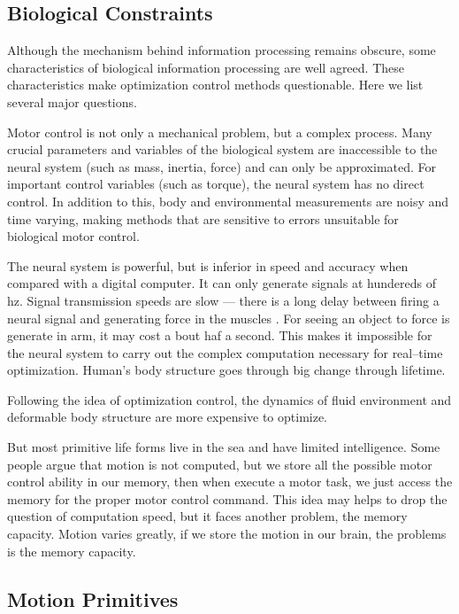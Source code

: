 \subsection{Biological Constraints}
Although the mechanism behind information processing remains obscure, some characteristics of biological information processing are well agreed.
These characteristics make optimization control methods questionable. 
Here we list several major questions\citep{Glynn2003}.  
\begin{itemize}
Motor control is not only a mechanical problem, but a complex process. 
Many crucial parameters and variables of the biological system are inaccessible to the neural system (such as mass, inertia, force) and can only be approximated. 
For important control variables (such as torque), the neural system has no direct control.
In addition to this, body and environmental measurements are noisy and time varying, making methods that are sensitive to errors unsuitable for biological motor control.

The neural system is powerful, but is inferior in speed and accuracy when compared with a digital computer. It can only generate signals at hundereds of hz.
Signal transmission speeds are slow — there is a long delay between firing a neural signal and generating force in the muscles .
For seeing an object to force is generate in arm, it may cost a bout haf a second. 
This makes it impossible for the neural system to carry out the complex computation necessary for real–time optimization.
Human’s body structure goes through big change through lifetime.

Following the idea of optimization control, the dynamics of fluid environment and deformable body structure are more expensive to optimize. 

But most primitive life forms live in the sea and have limited intelligence. 
Some people argue that motion is not computed, but we store all the possible motor control ability in our memory, then when execute a motor task, we just access the memory for the proper motor control command.
This idea may helps to drop the question of computation speed, but it faces another problem, the memory capacity. 
Motion varies greatly, if we store the motion in our brain, the problems is the memory capacity.
\end{itemize}

\subsection{Motion Primitives}


